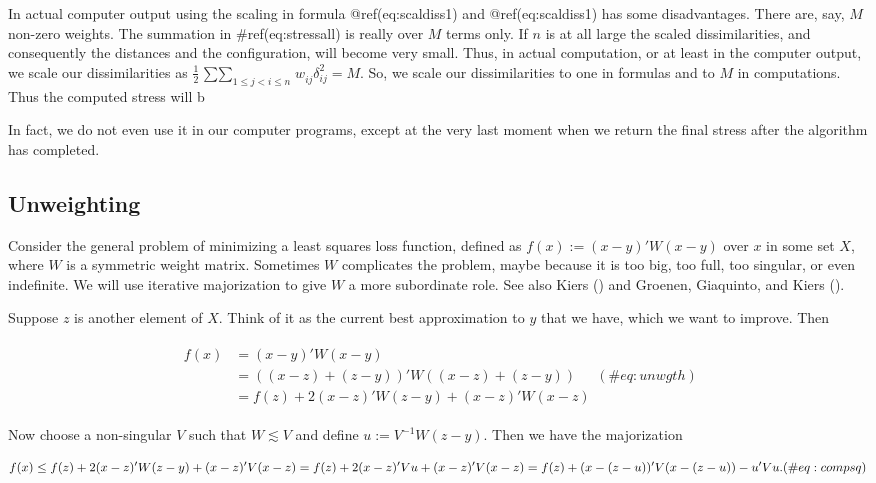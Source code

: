 \documentclass[
  12pt,
  letterpaper,
  DIV=11,
  numbers=noendperiod]{scrreprt}
\theoremstyle{remark}
\begin{document}
In actual computer output using the scaling in formula
@ref(eq:scaldiss1) and @ref(eq:scaldiss1) has some disadvantages. There
are, say, \(M\) non-zero weights. The summation in \#ref(eq:stressall)
is really over \(M\) terms only. If \(n\) is at all large the scaled
dissimilarities, and consequently the distances and the configuration,
will become very small. Thus, in actual computation, or at least in the
computer output, we scale our dissimilarities as
\(\frac12\mathop{\sum\sum}_{1\leq j<i\leq n} w_{ij}^{\ }\delta_{ij}^2=M\).
So, we scale our dissimilarities to one in formulas and to \(M\) in
computations. Thus the computed stress will b

In fact, we do not even use it in our computer programs, except at the
very last moment when we return the final stress after the algorithm has
completed.

\subsection{Unweighting}\label{minunweight}

Consider the general problem of minimizing a least squares loss
function, defined as \(f(x):=(x-y)'W(x-y)\) over \(x\) in some set
\(X\), where \(W\) is a symmetric weight matrix. Sometimes \(W\)
complicates the problem, maybe because it is too big, too full, too
singular, or even indefinite. We will use iterative majorization to give
\(W\) a more subordinate role. See also Kiers
() and Groenen, Giaquinto, and Kiers
().

Suppose \(z\) is another element of \(X\). Think of it as the current
best approximation to \(y\) that we have, which we want to improve. Then

\begin{align}
\begin{split}
f(x)&=(x-y)'W(x-y)\\
&=((x-z)+(z-y))'W((x-z)+(z-y))\\
&=f(z)+2(x-z)'W(z-y)+(x-z)'W(x-z)
\end{split}
(\#eq:unwgth)
\end{align}

Now choose a non-singular \(V\) such that \(W\lesssim V\) and define
\(u:=V^{-1}W(z-y)\). Then we have the majorization

\begin{equation}
f(x)\leq f(z)+2(x-z)'W(z-y)+(x-z)'V(x-z)=\\
f(z)+2(x-z)'Vu+(x-z)'V(x-z)=\\
f(z)+(x-(z-u))'V(x-(z-u))-u'Vu.
(\#eq:compsq)
\end{equation}
\end{document}
